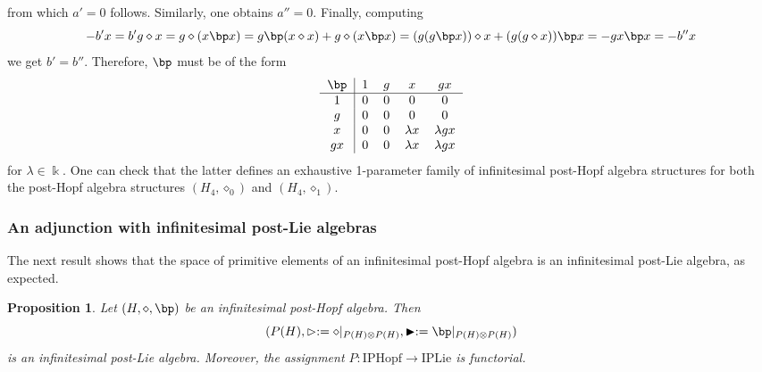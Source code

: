 \documentclass[10pt]{article}
\newtheorem {proposition} [lemma] {Proposition}
\theoremstyle{definition}
\newcommand{\wt}{\vartriangleright}
\newcommand{\bt}{\blacktriangleright}
\renewcommand{\wp}{\diamond}
\newcommand{\ot}{\otimes}
\begin{document}
from which $a'=0$ follows. Similarly, one obtains $a''=0$. Finally, computing 
\[
-b'x=b'g\wp x=g\wp(x\bp x)=g\bp(x\wp x)+g\wp(x\bp x)= (g(g\bp x))\wp x+(g(g\wp x))\bp x=-gx\bp x=-b''x
\]
we get $b'=b''$. Therefore, $\bp$ must be of the form
\[
\begin{tabular}{c|cccc}
    $\bp$& $1$ & $g$ & $x$ & $gx$\\ \hline
    $1$ & $0$ & $0$ & $0$ & $0$ \\ 
    $g$ & $0$ & $0$ & $0$ & $0$ \\ 
    $x$ & $0$ & $0$ & $\lambda x$ & $\lambda gx$ \\ 
    $gx$ & $0$ & $0$ & $\lambda x$ & $\lambda gx$ \\ 
\end{tabular}
\]
for $\lambda\in\Bbbk$. One can check that the latter defines an exhaustive 1-parameter family of infinitesimal post-Hopf algebra structures for both the post-Hopf algebra structures $(H_{4},\wp_{0})$ and $(H_{4},\wp_{1})$.

\subsubsection{An adjunction with infinitesimal post-Lie algebras}

The next result shows that the space of primitive elements of an infinitesimal post-Hopf algebra is an infinitesimal post-Lie algebra, as expected.

\begin{proposition}\label{prop:primitive}
Let $(H,\wp,\bp)$ be an infinitesimal post-Hopf algebra. Then \[(P(H),\wt:=\wp|_{P(H)\ot P(H)},\bt:=\bp|_{P(H)\ot P(H)})\] is an infinitesimal post-Lie algebra. Moreover, the  assignment $P:\mathrm{IPHopf}\to\mathrm{IPLie}$ is functorial. 
\end{proposition}
\end{document}
